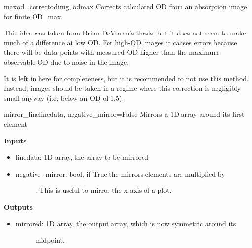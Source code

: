 \documentclass[letterpaper,10pt,english]{manual}
\begin{document}
\hypertarget{odysseus.imageprocess.maxod_correct}{}\begin{funcdesc}{maxod\_correct}{odimg, odmax}
Corrects calculated OD from an absorption image for finite OD\_max

This idea was taken from Brian DeMarco's thesis, but it does not seem to
make much of a difference at low OD. For high-OD images it causes errors
because there will be data points with measured OD higher than the maximum
observable OD due to noise in the image.

It is left in here for completeness, but it is recommended to not use this
method. Instead, images should be taken in a regime where this correction
is negligibly small anyway (i.e. below an OD of 1.5).
\end{funcdesc}

\hypertarget{odysseus.imageprocess.mirror_line}{}\begin{funcdesc}{mirror\_line}{linedata, negative\_mirror=False}
Mirrors a 1D array around its first element

\textbf{Inputs}
\begin{itemize}
\item {} 
linedata: 1D array, the array to be mirrored

\item {} \begin{description}
\item[negative\_mirror: bool, if True the mirrors elements are multiplied by] . This is useful to mirror the x-axis of a plot.

\end{description}

\end{itemize}

\textbf{Outputs}
\begin{itemize}
\item {} \begin{description}
\item[mirrored: 1D array, the output array, which is now symmetric around its] \leavevmode
midpoint.

\end{description}

\end{itemize}
\end{funcdesc}
\end{document}
